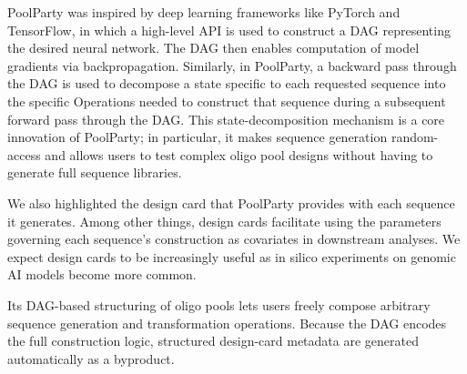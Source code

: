 PoolParty was inspired by deep learning frameworks like PyTorch and TensorFlow, in which a high-level API is used to construct a DAG representing the desired neural network. The DAG then enables computation of model gradients via backpropagation. Similarly, in PoolParty, a backward pass through the DAG is used to decompose a state specific to each requested sequence into the specific Operations needed to construct that sequence during a subsequent forward pass through the DAG. This state-decomposition mechanism is a core innovation of PoolParty; in particular, it makes sequence generation random-access and allows users to test complex oligo pool designs without having to generate full sequence libraries.

We also highlighted the design card that PoolParty provides with each sequence it generates. Among other things, design cards facilitate using the parameters governing each sequence's construction as covariates in downstream analyses.   We expect design cards to be increasingly useful as in silico experiments on genomic AI models become more common.

 Its DAG-based structuring of oligo pools lets users freely compose arbitrary sequence generation and transformation operations. Because the DAG encodes the full construction logic, structured design-card metadata are generated automatically as a byproduct. 

